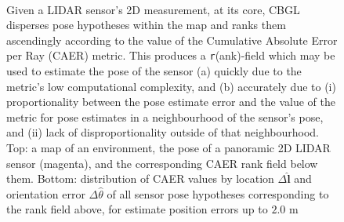 \begin{figure}\vspace{0.4em}
  \subfloat{    \label{fig:a}} \vspace{-1.7cm}\\
  \subfloat{\hspace{-0.3cm} \label{fig:b}}
  \caption{\small
           Given a LIDAR sensor's 2D measurement, at its core, CBGL disperses
           pose hypotheses within the map and ranks them ascendingly according
           to the value of the Cumulative Absolute Error per Ray (CAER) metric.
           This produces a
           \texttt{r}(ank)-field which may be used to estimate the pose of the
           sensor (a) quickly due to the metric's low computational complexity,
           and (b) accurately due to (i) proportionality between the pose
           estimate error and the value of the metric for pose estimates in a
           neighbourhood of the sensor's pose, and (ii) lack of
           disproportionality outside of that neighbourhood.  Top: a map of an
           environment, the pose of a panoramic 2D LIDAR sensor (magenta), and
           the corresponding CAER rank field below them. Bottom: distribution
           of CAER values by location $\Delta \hat{\bm{l}}$ and orientation
           error $\Delta \hat{\theta}$ of all sensor pose hypotheses
           corresponding to the rank field above, for estimate position errors
           up to $2.0$ m
           }
  \vspace{-0.65cm}
  \label{fig:face}
\end{figure}


